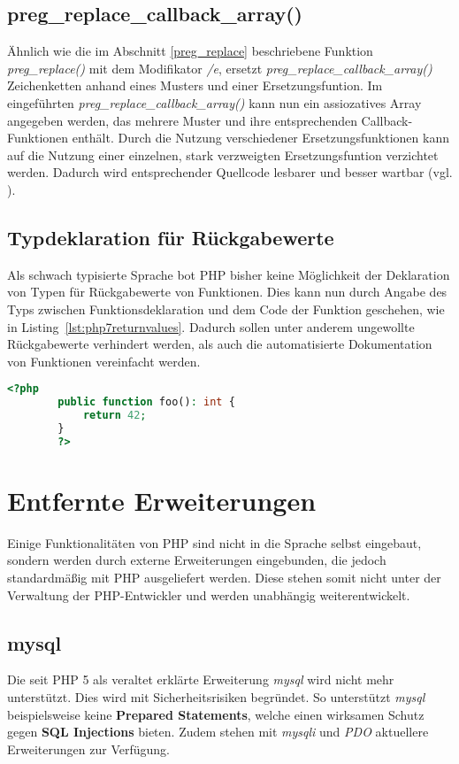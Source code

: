     \subsection{preg\_replace\_callback\_array()}
    Ähnlich wie die im Abschnitt \ref{preg_replace} beschriebene Funktion \textit{preg\_replace()} mit dem Modifikator \textit{/e}, ersetzt 
    \textit{preg\_replace\_callback\_array()} Zeichenketten anhand eines Musters und einer Ersetzungsfuntion. Im eingeführten \textit{preg\_replace\_callback\_array()} 
    kann nun ein assiozatives Array angegeben werden, das mehrere Muster und ihre entsprechenden Callback-Funktionen enthält. Durch die Nutzung verschiedener 
    Ersetzungsfunktionen kann auf die Nutzung einer einzelnen, stark verzweigten Ersetzungsfuntion verzichtet werden. Dadurch wird entsprechender Quellcode lesbarer 
    und besser wartbar (vgl. \cite[S. 34f]{martin_clean_2012}).

    \subsection{Typdeklaration für Rückgabewerte} %
    Als schwach typisierte Sprache bot \acs{PHP} bisher keine Möglichkeit der Deklaration von Typen für Rückgabewerte von Funktionen. Dies kann nun durch Angabe des
    Typs zwischen Funktionsdeklaration und dem Code der Funktion geschehen, wie in Listing~\ref{lst:php7returnvalues}. Dadurch sollen unter anderem ungewollte Rückgabewerte verhindert werden, als auch die 
    automatisierte Dokumentation von Funktionen vereinfacht werden. \cite{morrison_php:_2014-1} 

    \begin{lstlisting}[language=php, caption={Typdeklaration für Rückgabewerte}, label={lst:php7returnvalues}]
        <?php
        public function foo(): int {
            return 42;
        }
        ?>
    \end{lstlisting}

\section{Entfernte Erweiterungen}
Einige Funktionalitäten von \acs{PHP} sind nicht in die Sprache selbst eingebaut, sondern werden durch externe Erweiterungen eingebunden, die jedoch standardmäßig
mit \acs{PHP} ausgeliefert werden. Diese stehen somit nicht unter der Verwaltung der \acs{PHP}-Entwickler und werden unabhängig weiterentwickelt.
    \subsection{mysql}
    Die seit \acs{PHP} 5 als veraltet erklärte Erweiterung \textit{mysql} wird nicht mehr unterstützt. Dies wird mit Sicherheitsrisiken begründet. So unterstützt
    \textit{mysql} beispielsweise keine \textbf{Prepared Statements}, welche einen wirksamen Schutz gegen \textbf{SQL Injections} bieten. \cite{oracle_mysql_nodate}
    Zudem stehen mit \textit{mysqli} und \textit{PDO} aktuellere Erweiterungen zur Verfügung.
    
